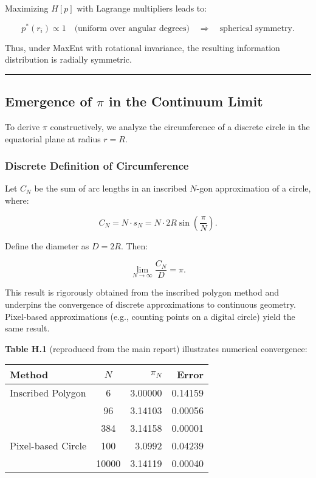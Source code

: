 \documentclass[12pt, a4paper]{article}
\begin{document}
Maximizing $H[p]$ with Lagrange multipliers leads to:

\[
p^*(r_i) \propto 1 \quad \text{(uniform over angular degrees)} \quad \Rightarrow \quad \text{spherical symmetry}.
\]

Thus, under MaxEnt with rotational invariance, the resulting information distribution is radially symmetric.

\bigskip
\hrule
\bigskip

\subsection{Emergence of $\pi$ in the Continuum Limit}

To derive $\pi$ constructively, we analyze the circumference of a discrete circle in the equatorial plane at radius $r = R$.

\subsubsection*{Discrete Definition of Circumference}

Let $C_N$ be the sum of arc lengths in an inscribed $N$-gon approximation of a circle, where:

\[
C_N = N \cdot s_N = N \cdot 2R \sin\left(\frac{\pi}{N}\right).
\]

Define the diameter as $D = 2R$. Then:

\[
\lim_{N \to \infty} \frac{C_N}{D} = \pi.
\]

This result is rigorously obtained from the inscribed polygon method and underpins the convergence of discrete approximations to continuous geometry. Pixel-based approximations (e.g., counting points on a digital circle) yield the same result.

\medskip

\textbf{Table H.1} (reproduced from the main report) illustrates numerical convergence:

\begin{center}
\begin{tabular}{@{}lcrr@{}}
\toprule
Method & $N$ & $\pi_N$ & Error \\ \midrule
Inscribed Polygon & 6 & 3.00000 & 0.14159 \\
                  & 96 & 3.14103 & 0.00056 \\
                  & 384 & 3.14158 & 0.00001 \\
Pixel-based Circle  & 100 & 3.0992 & 0.04239 \\
                   & 10000 & 3.14119 & 0.00040 \\
\bottomrule
\end{tabular}
\end{center}
\end{document}
